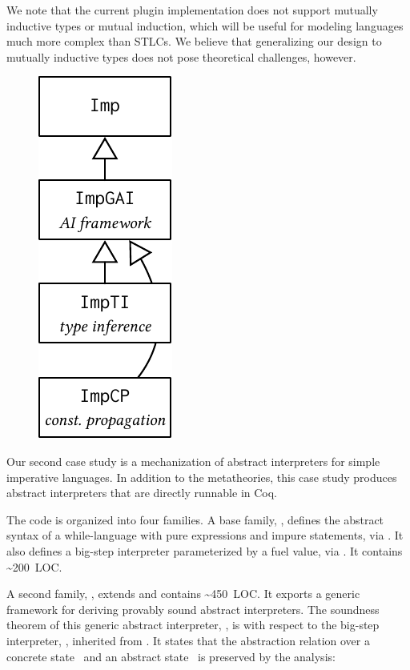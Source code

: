 We note that the current plugin implementation does not support
mutually inductive types or mutual induction, which will be
useful for modeling languages much more complex than STLCs.
We believe that generalizing our design to mutually inductive types does
not pose theoretical challenges, however.



\begin{figure}
\includegraphics[scale=.68]{graphics/ai-casestudy.pdf}
\end{figure}

Our second case study is a mechanization of abstract interpreters
for simple imperative languages.
In addition to the metatheories, this case study produces abstract
interpreters that are directly runnable in Coq.

The code is organized into four families.
A base family, , defines the abstract syntax of a while-language
with pure expressions and impure statements, via .
It also defines a big-step interpreter parameterized by a fuel value,
via .
It contains \textasciitilde 200~LOC.

A second family, , extends  and contains
\textasciitilde 450~LOC.
It exports a generic framework for deriving provably sound
abstract interpreters.
The soundness theorem of this generic abstract interpreter, ,
is with respect to the big-step interpreter, , inherited from .
It states that the abstraction relation  over a
concrete state~ and an abstract state~ is preserved
by the analysis:

